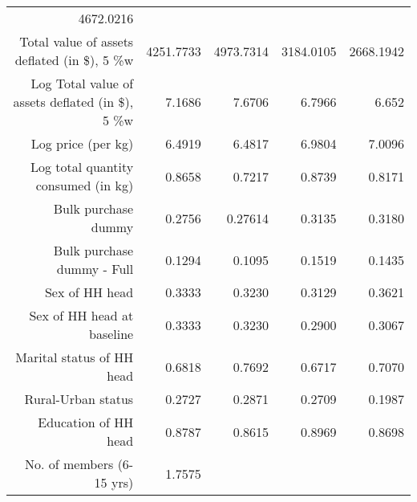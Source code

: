 \begin{sidewaystable}[!h]
\begin{tabular}{lllll}
  \multicolumn{1}{|r|}{4672.0216}  \\
\multicolumn{1}{|r|}{Total value of assets deflated (in \$), 5
\%w} &
  \multicolumn{1}{|r}{4251.7733} &
  \multicolumn{1}{|r}{4973.7314} &
  \multicolumn{1}{|r}{3184.0105} &
  \multicolumn{1}{|r|}{2668.1942}  \\
\multicolumn{1}{|r}{Log Total value of assets deflated (in \$), 5
\%w} &
  \multicolumn{1}{|r}{7.1686} &
  \multicolumn{1}{|r}{7.6706} &
  \multicolumn{1}{|r}{6.7966} &
  \multicolumn{1}{|r|}{6.652} \\
\multicolumn{1}{|r}{Log price (per kg)} &
  \multicolumn{1}{|r}{6.4919} &
  \multicolumn{1}{|r}{6.4817} &
  \multicolumn{1}{|r}{6.9804} &
  \multicolumn{1}{|r|}{7.0096} \\
\multicolumn{1}{|r}{Log total quantity consumed (in kg)} &
  \multicolumn{1}{|r}{0.8658} &
  \multicolumn{1}{|r}{0.7217} &
  \multicolumn{1}{|r}{0.8739} &
  \multicolumn{1}{|r|}{0.8171} \\
\multicolumn{1}{|r}{Bulk purchase dummy} &
  \multicolumn{1}{|r}{0.2756} &
  \multicolumn{1}{|r}{0.27614} &
  \multicolumn{1}{|r}{0.3135} &
  \multicolumn{1}{|r|}{0.3180}  \\
\multicolumn{1}{|r}{Bulk purchase dummy - Full} &
  \multicolumn{1}{|r}{0.1294} &
  \multicolumn{1}{|r}{0.1095} &
  \multicolumn{1}{|r}{0.1519} &
  \multicolumn{1}{|r|}{0.1435}  \\
\multicolumn{1}{|r}{Sex of HH head} &
  \multicolumn{1}{|r}{0.3333} &
  \multicolumn{1}{|r}{0.3230} &
  \multicolumn{1}{|r}{0.3129} &
  \multicolumn{1}{|r|}{0.3621}  \\
\multicolumn{1}{|r}{Sex of HH head at baseline} &
  \multicolumn{1}{|r}{0.3333} &
  \multicolumn{1}{|r}{0.3230} &
  \multicolumn{1}{|r}{0.2900} &
  \multicolumn{1}{|r|}{0.3067}  \\
\multicolumn{1}{|r}{Marital status of HH head} &
  \multicolumn{1}{|r}{0.6818} &
  \multicolumn{1}{|r}{0.7692} &
  \multicolumn{1}{|r}{0.6717} &
  \multicolumn{1}{|r|}{0.7070}  \\
\multicolumn{1}{|r}{Rural-Urban status} &
  \multicolumn{1}{|r}{0.2727} &
  \multicolumn{1}{|r}{0.2871} &
  \multicolumn{1}{|r}{0.2709} &
  \multicolumn{1}{|r|}{0.1987}\\
\multicolumn{1}{|r}{Education of HH head} &
  \multicolumn{1}{|r}{0.8787} &
  \multicolumn{1}{|r}{0.8615} &
  \multicolumn{1}{|r}{0.8969} &
  \multicolumn{1}{|r|}{0.8698}  \\
\multicolumn{1}{|r}{No. of members (6-15 yrs)} &
  \multicolumn{1}{|r}{1.7575} &

\end{tabular}
\end{sidewaystable}
